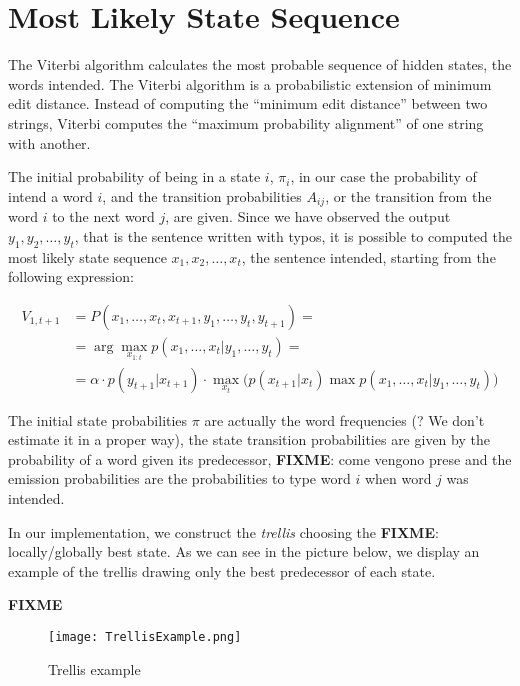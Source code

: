 \section{Most Likely State Sequence}

The Viterbi algorithm calculates the most probable sequence of hidden states, the words intended.
The Viterbi algorithm is a probabilistic extension of minimum edit distance. Instead of computing the “minimum 
edit distance” between two strings, Viterbi computes the “maximum probability alignment” of one string with 
another. 



The initial probability of being in a state $i$, $\pi_i$, in our case the probability of intend a word $i$, and the 
transition probabilities $A_{ij}$, or the transition from the word $i$ to the next word $j$, are given. Since we have 
observed the output $y_1, y_2, \dots , y_t$, that is the sentence written with typos, it is possible to computed the most 
likely state sequence $x_1, x_2, \dots , x_t$, the sentence intended, starting from the following expression:

\begin{equation}
	\begin{aligned}
		V_{1,t+1} &= P(x_1, \dots, x_t, x_{t+1}, y_1, \dots, y_t,  y_{t+1}) = \\
						&= \arg\max_{x_{1:t}} p(x_1, \dots, x_t | y_1, \dots, y_t) = \\
						& =  \alpha \cdot p(y_{t+1}|x_{t+1})\cdot\max_{x_t} \Big( p(x_{t+1}|x_t) \max p(x_1, \dots, x_{t}|y_1, 
						\dots, y_t)\Big)
	\end{aligned}
\end{equation}

The initial state probabilities $\pi$ are actually the word frequencies (? We don’t estimate it in a proper way), the state 
transition probabilities are given by the probability of a word given its predecessor, \textbf{FIXME}: {come vengono prese} 
and the emission probabilities are the probabilities to type word $i$ when word $j$ was intended.

In our implementation, we construct the \textit{trellis} choosing the \textbf{FIXME}: {locally/globally} best state. As we can 
see in the 
picture below, we display an example of the trellis drawing only the best predecessor of each state.

\textbf{FIXME}
\begin{figure}[H]
	\centering
	\texttt{[image: TrellisExample.png]}
	\caption{Trellis example}
	\label{fig:trellis}
\end{figure}

